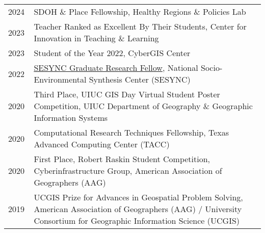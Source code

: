 \documentclass{acmcv}
\begin{document}
    \begin{longtable}{p{0.1\linewidth} p{0.9\linewidth}}
        2024 & SDOH \& Place Fellowship, Healthy Regions \& Policies Lab \\

        2023 & Teacher Ranked as Excellent By Their Students,
        Center for Innovation in Teaching \& Learning\\

        2023 & Student of the Year 2022, CyberGIS Center\\

        2022 & \href{https://www.sesync.org/project/graduate-pursuits-request-for-proposals/financial-opacity-and-challenges-to-forest}{SESYNC Graduate Research Fellow}, National Socio-Environmental Synthesis Center (SESYNC)\\

        2020 & Third Place, UIUC GIS Day Virtual Student Poster Competition, UIUC Department of Geography \& Geographic Information Systems \\

        2020 & Computational Research Techniques Fellowship, Texas Advanced Computing Center (TACC)\\

        2020 & First Place, Robert Raskin Student Competition, Cyberinfrastructure Group, American Association of Geographers (AAG) \\

        2019 & UCGIS Prize for Advances in Geospatial Problem Solving, American Association of Geographers (AAG) / University Consortium for Geographic Information Science (UCGIS)  \\





    \end{longtable}
\end{document}
